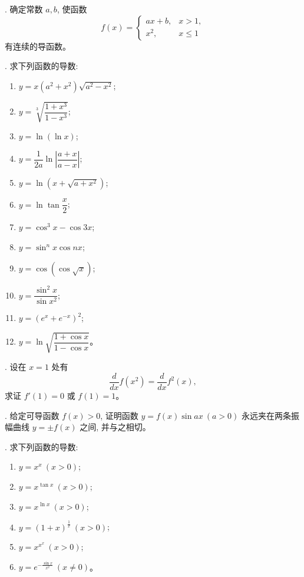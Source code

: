 \documentclass[UTF8,12pt,a4paper,fontset=fandol]{ctexart}
\begin{document}
. 确定常数 $a,b$, 使函数
\[
  f(x)=
  \begin{cases}
    ax+b, & x>1,\\
    x^2, & x\leqslant1
  \end{cases}
\]
有连续的导函数。

. 求下列函数的导数:
\begin{enumerate}
  \item $y=x(a^2+x^2)\sqrt{a^2-x^2}$;
  \item $y=\sqrt[3]{\dfrac{1+x^3}{1-x^3}}$;
  \item $y=\ln(\ln x)$;
  \item $y=\dfrac1{2a}\ln\left|\dfrac{a+x}{a-x}\right|$;
  \item $y=\ln(x+\sqrt{a+x^2})$;
  \item $y=\ln\tan\dfrac x2$;
  \item $y=\cos^3x-\cos3x$;
  \item $y=\sin^nx\cos nx$;
  \item $y=\cos(\cos\sqrt{x})$;
  \item $y=\dfrac{\sin^2x}{\sin x^2}$;
  \item $y=(e^x+e^{-x})^2$;
  \item $y=\ln\sqrt{\dfrac{1+\cos x}{1-\cos x}}$。
\end{enumerate}

. 设在 $x=1$ 处有
\[
  \frac{d}{dx}f(x^2)=\frac{d}{dx}f^2(x),
\]
求证 $f'(1)=0$ 或 $f(1)=1$。

. 给定可导函数 $f(x)>0$, 证明函数 $y=f(x)\sin ax\ (a>0)$ 永远夹在两条振幅曲线 $y=\pm f(x)$ 之间, 并与之相切。

. 求下列函数的导数:
\begin{enumerate}
  \item $y=x^x\ (x>0)$;
  \item $y=x^{\tan x}\ (x>0)$;
  \item $y=x^{\ln x}\ (x>0)$;
  \item $y=(1+x)^{\frac1x}\ (x>0)$;
  \item $y=x^{x^x}\ (x>0)$;
  \item $y=e^{-\frac{\sin x}{x^2}}\ (x\ne0)$。
\end{enumerate}
\end{document}

